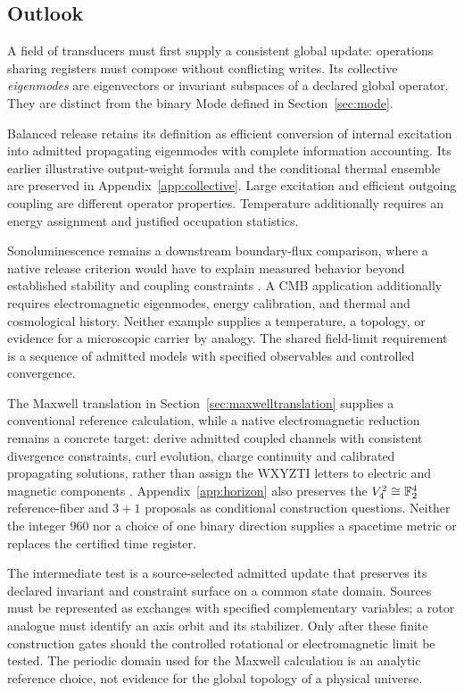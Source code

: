 \label{part:correspondence}\subsection*{Outlook}
\label{sec:outlook}\label{sec:sonoluminescence}\label{sec:fieldlimit}\label{sec:cmb}
A field of transducers must first supply a consistent global update: operations sharing registers must compose without conflicting writes. Its collective \emph{eigenmodes} are eigenvectors or invariant subspaces of a declared global operator. They are distinct from the binary Mode defined in Section~\ref{sec:mode}.

Balanced release retains its definition as efficient conversion of internal excitation into admitted propagating eigenmodes with complete information accounting. Its earlier illustrative output-weight formula and the conditional thermal ensemble are preserved in Appendix~\ref{app:collective}. Large excitation and efficient outgoing coupling are different operator properties. Temperature additionally requires an energy assignment and justified occupation statistics.

Sonoluminescence remains a downstream boundary-flux comparison, where a native release criterion would have to explain measured behavior beyond established stability and coupling constraints \citep{hilgenfeldt1996}. A CMB application additionally requires electromagnetic eigenmodes, energy calibration, and thermal and cosmological history. Neither example supplies a temperature, a topology, or evidence for a microscopic carrier by analogy. The shared field-limit requirement is a sequence of admitted models with specified observables and controlled convergence.


The Maxwell translation in Section~\ref{sec:maxwelltranslation} supplies a conventional reference calculation, while a native electromagnetic reduction remains a concrete target: derive admitted coupled channels with consistent divergence constraints, curl evolution, charge continuity and calibrated propagating solutions, rather than assign the WXYZTI letters to electric and magnetic components \citep{feynmanmaxwell}. Appendix~\ref{app:horizon} also preserves the $V_4^2\cong\mathbb F_2^4$ reference-fiber and $3+1$ proposals as conditional construction questions. Neither the integer $960$ nor a choice of one binary direction supplies a spacetime metric or replaces the certified time register.


The intermediate test is a source-selected admitted update that preserves its declared invariant and constraint surface on a common state domain. Sources must be represented as exchanges with specified complementary variables; a rotor analogue must identify an axis orbit and its stabilizer. Only after these finite construction gates should the controlled rotational or electromagnetic limit be tested. The periodic domain used for the Maxwell calculation is an analytic reference choice, not evidence for the global topology of a physical universe.
